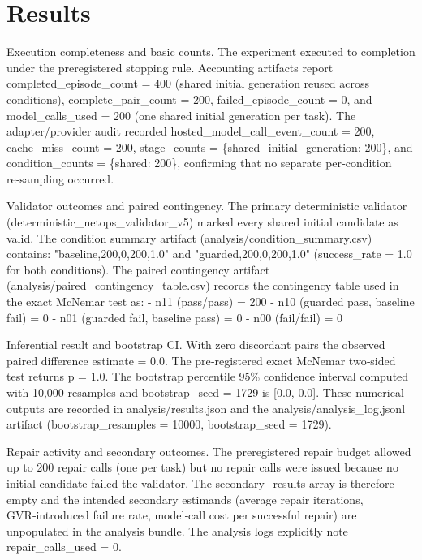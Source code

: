 \documentclass[conference]{IEEEtran}
\begin{document}
\section{Results}
Execution completeness and basic counts. The experiment executed to completion under the preregistered stopping rule. Accounting artifacts report completed\_episode\_count = 400 (shared initial generation reused across conditions), complete\_pair\_count = 200, failed\_episode\_count = 0, and model\_calls\_used = 200 (one shared initial generation per task). The adapter/provider audit recorded hosted\_model\_call\_event\_count = 200, cache\_miss\_count = 200, stage\_counts = \{shared\_initial\_generation: 200\}, and condition\_counts = \{shared: 200\}, confirming that no separate per‑condition re‑sampling occurred.

Validator outcomes and paired contingency. The primary deterministic validator (deterministic\_netops\_validator\_v5) marked every shared initial candidate as valid. The condition summary artifact (analysis/condition\_summary.csv) contains: "baseline,200,0,200,1.0" and "guarded,200,0,200,1.0" (success\_rate = 1.0 for both conditions). The paired contingency artifact (analysis/paired\_contingency\_table.csv) records the contingency table used in the exact McNemar test as:
- n11 (pass/pass) = 200
- n10 (guarded pass, baseline fail) = 0
- n01 (guarded fail, baseline pass) = 0
- n00 (fail/fail) = 0

Inferential result and bootstrap CI. With zero discordant pairs the observed paired difference estimate = 0.0. The pre‑registered exact McNemar two‑sided test returns p = 1.0. The bootstrap percentile 95\% confidence interval computed with 10,000 resamples and bootstrap\_seed = 1729 is [0.0, 0.0]. These numerical outputs are recorded in analysis/results.json and the analysis/analysis\_log.jsonl artifact (bootstrap\_resamples = 10000, bootstrap\_seed = 1729).

Repair activity and secondary outcomes. The preregistered repair budget allowed up to 200 repair calls (one per task) but no repair calls were issued because no initial candidate failed the validator. The secondary\_results array is therefore empty and the intended secondary estimands (average repair iterations, GVR‑introduced failure rate, model‑call cost per successful repair) are unpopulated in the analysis bundle. The analysis logs explicitly note repair\_calls\_used = 0.
\end{document}
